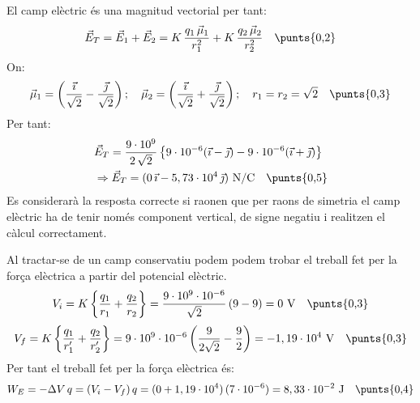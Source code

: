 \begin{solapartat}
El camp elèctric és una magnitud vectorial per tant:
\[ \vec{E}_T = \vec{E}_1 + \vec{E}_2 = K\,\frac{q_1\,\vec{\mu}_1}{r_1^2} + K\,\frac{q_2\,\vec{\mu}_2}{r_2^2} \quad \text{\punts{0,2}} \]
On:
\[ \vec{\mu}_1 = \left(\frac{\vec{\imath}}{\sqrt{2}} - \frac{\vec{\jmath}}{\sqrt{2}}\right);\quad \vec{\mu}_2 = \left(\frac{\vec{\imath}}{\sqrt{2}} + \frac{\vec{\jmath}}{\sqrt{2}}\right);\quad r_1 = r_2 = \sqrt{2} \quad \text{\punts{0,3}} \]
Per tant:
\begin{align*}
&\vec{E}_T = \frac{9\cdot 10^{9}}{2\,\sqrt{2}}\left\{9\cdot 10^{-6}(\vec{\imath} - \vec{\jmath}) - 9\cdot 10^{-6}(\vec{\imath} + \vec{\jmath})\right\}\\
&\Rightarrow \vec{E}_T = (0\,\vec{\imath} - 5,73\cdot 10^{4}\,\vec{\jmath})\ \mathrm{N/C} \quad \text{\punts{0,5}}
\end{align*}
Es considerarà la resposta correcte si raonen que per raons de simetria el camp elèctric ha de tenir només component vertical, de signe negatiu i realitzen el càlcul correctament.
\end{solapartat}

\begin{solapartat}
Al tractar-se de un camp conservatiu podem podem trobar el treball fet per la força elèctrica a partir del potencial elèctric.
\[ V_i = K\left\{\frac{q_1}{r_1} + \frac{q_2}{r_2}\right\} = \frac{9\cdot 10^{9}\cdot 10^{-6}}{\sqrt{2}}\,(9 - 9) = 0\ \mathrm{V} \quad \text{\punts{0,3}} \]
\[ V_f = K\left\{\frac{q_1}{r'_1} + \frac{q_2}{r'_2}\right\} = 9\cdot 10^{9}\cdot 10^{-6}\left(\frac{9}{2\sqrt{2}} - \frac{9}{2}\right) = -1,19\cdot 10^{4}\ \mathrm{V} \quad \text{\punts{0,3}} \]
Per tant el treball fet per la força elèctrica és:
\[ W_E = -\Delta V\,q = (V_i - V_f)\,q = (0 + 1,19\cdot 10^{4})\,(7\cdot 10^{-6}) = 8,33\cdot 10^{-2}\ \mathrm{J} \quad \text{\punts{0,4}} \]
\end{solapartat}

